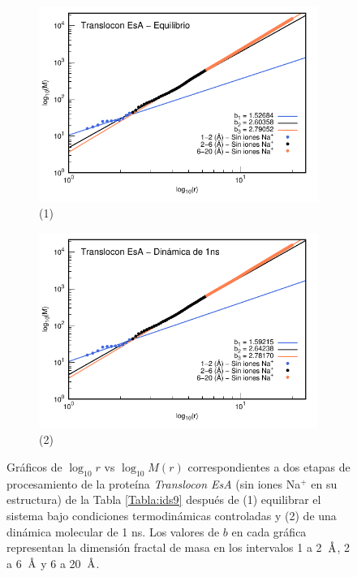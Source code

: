 	
	\begin{figure}[H]
		\centering
		\begin{subfigure}{0.49\textwidth}
			\centering
			\includegraphics[width=\linewidth,page=1]{graphs/PDBs/7khw/ions/7khwEq-oions.pdf}
			\caption{(1)}
		\end{subfigure}
		\hfill
		\begin{subfigure}{0.49\textwidth}
			\centering
			\includegraphics[width=\linewidth,page=1]{graphs/PDBs/7khw/ions/7khw1ns-oions.pdf}
			\caption{(2)}
		\end{subfigure}
		\caption{Gr\'{a}ficos de $\log_{10}r$ vs $\log_{10}M(r)$ correspondientes a dos etapas de procesamiento de la prote\'{i}na \textit{Translocon EsA} (sin iones Na$^{+}$ en su estructura) de la Tabla \ref{Tabla:ids9} despu\'{e}s de (1) equilibrar el sistema bajo condiciones termodin\'{a}micas controladas y (2) de una din\'{a}mica molecular de 1 ns. Los valores de $b$ en cada gr\'{a}fica representan la dimensi\'{o}n fractal de masa en los intervalos 1 a 2~$\textup{\r{A}}$, 2 a 6~$\textup{\r{A}}$ y 6 a 20~$\textup{\r{A}}$.}
		\label{fig:7khw-oions}
	\end{figure}
	
